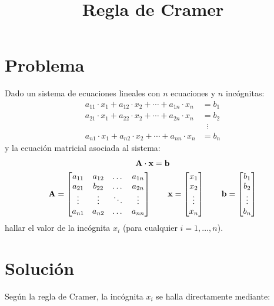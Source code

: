 \documentclass[11pt]{article}
\begin{document}
\title{Regla de Cramer}
\author{}
\date{}
\maketitle
\section{Problema}

Dado un sistema de ecuaciones lineales con \(n\) ecuaciones y \(n\) incógnitas:
\begin{align*}
    a_{11}\cdot x_{1} + a_{12}\cdot x_{2} + \dotsb + a_{1n}\cdot x_{n} &= b_{1}\\
    a_{21}\cdot x_{1} + a_{22}\cdot x_{2} + \dotsb + a_{2n}\cdot x_{n} &= b_{2}\\
    &\;\;\vdots \\
    a_{n1}\cdot x_{1} + a_{n2}\cdot x_{2} + \dotsb + a_{nn}\cdot x_{n} &= b_{n}
\end{align*}
y la ecuación matricial asociada al sistema:
\begin{gather*}
    \bf A\cdot x = b\\
    \mathbf{A} = \begin{bmatrix}
        a_{11} & a_{12} & \dotso & a_{1n} \\
        a_{21} & b_{22} & \dotso & a_{2n} \\
        \vdots & \vdots & \ddots & \vdots \\
        a_{n1} & a_{n2} & \dotso & a_{nn} 
        \end{bmatrix} \qquad
    \mathbf{x} = \begin{bmatrix}
        x_1\\ x_2\\ \vdots \\ x_n
        \end{bmatrix} \qquad
    \mathbf{b} = \begin{bmatrix}
        b_1\\
        b_2\\
        \vdots \\
        b_n
        \end{bmatrix}
\end{gather*}
hallar el valor de la incógnita \(x_i\) (para cualquier \(i = 1,\dotsc,n\)).

\vspace{2cm}

\section{Solución}
Según la regla de Cramer, la incógnita \(x_i\) se halla directamente mediante:
\end{document}
